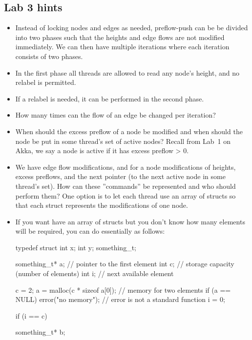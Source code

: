 \documentclass{forsete}
\begin{document}
{\subsection*{Lab 3 hints}

\begin{itemize}
\item Instead of locking nodes and edges as needed, preflow-push can be
be divided into two phases such that the heights and edge flows
are not modified immediately. We can then have multiple iterations
where each iteration consists of two phases.

\item In the first phase all threads are allowed to read any node's 
height, and no relabel is permitted.

\item If a relabel is needed, it can be performed in the second phase.

\item How many times can the flow of an edge
be changed per iteration?

\item When should the excess preflow of a node 
be modified and when should the node be
	put in some thread's set of active nodes? Recall from Lab~1 on
	Akka, we say a node is active if it has excess preflow > 0.

\item We have edge flow modifications, and for a node modifications
of heights, excess preflows, and
the next pointer (to the next active node in some thread's set).
How can these ''commands'' be represented and who should perform them? 
One option is to let each thread use an array of structs so that
each struct represents the modifications of one node.

\item If you want have an array of structs but you don't know how many elements
will be required, you can do essentially as follows:

\begin{ccode}
typedef struct {
	int	x;
	int	y;
} something_t;

something_t*		a;	// pointer to the first element
int			c;	// storage capacity (number of elements)
int			i;	// next available element

c = 2;
a = malloc(c * sizeof a[0]);	// memory for two elements
if (a == NULL)
	error("no memory");	// error is not a standard function
i = 0;

if (i == c) {
	something_t*	b;

}
\end{ccode}
\end{itemize}}
\end{document}

